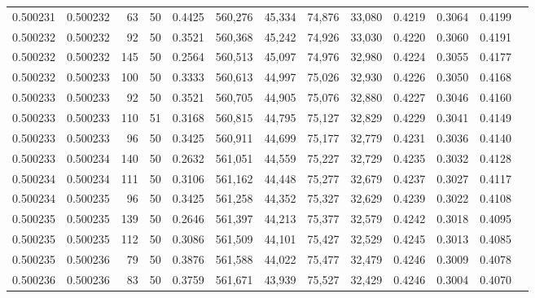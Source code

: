 \begin{tabular}{rrrrrrrrrrrrr}
0.500231 & 0.500232 &    63 &  50 &                                     0.4425 & 560,276 &  45,334 &  74,876 &  33,080 & 0.4219 & 0.3064 & 0.4199 \\
0.500232 & 0.500232 &    92 &  50 &                                     0.3521 & 560,368 &  45,242 &  74,926 &  33,030 & 0.4220 & 0.3060 & 0.4191 \\
0.500232 & 0.500232 &   145 &  50 &                                     0.2564 & 560,513 &  45,097 &  74,976 &  32,980 & 0.4224 & 0.3055 & 0.4177 \\
0.500232 & 0.500233 &   100 &  50 &                                     0.3333 & 560,613 &  44,997 &  75,026 &  32,930 & 0.4226 & 0.3050 & 0.4168 \\
0.500233 & 0.500233 &    92 &  50 &                                     0.3521 & 560,705 &  44,905 &  75,076 &  32,880 & 0.4227 & 0.3046 & 0.4160 \\
0.500233 & 0.500233 &   110 &  51 &                                     0.3168 & 560,815 &  44,795 &  75,127 &  32,829 & 0.4229 & 0.3041 & 0.4149 \\
0.500233 & 0.500233 &    96 &  50 &                                     0.3425 & 560,911 &  44,699 &  75,177 &  32,779 & 0.4231 & 0.3036 & 0.4140 \\
0.500233 & 0.500234 &   140 &  50 &                                     0.2632 & 561,051 &  44,559 &  75,227 &  32,729 & 0.4235 & 0.3032 & 0.4128 \\
0.500234 & 0.500234 &   111 &  50 &                                     0.3106 & 561,162 &  44,448 &  75,277 &  32,679 & 0.4237 & 0.3027 & 0.4117 \\
0.500234 & 0.500235 &    96 &  50 &                                     0.3425 & 561,258 &  44,352 &  75,327 &  32,629 & 0.4239 & 0.3022 & 0.4108 \\
0.500235 & 0.500235 &   139 &  50 &                                     0.2646 & 561,397 &  44,213 &  75,377 &  32,579 & 0.4242 & 0.3018 & 0.4095 \\
0.500235 & 0.500235 &   112 &  50 &                                     0.3086 & 561,509 &  44,101 &  75,427 &  32,529 & 0.4245 & 0.3013 & 0.4085 \\
0.500235 & 0.500236 &    79 &  50 &                                     0.3876 & 561,588 &  44,022 &  75,477 &  32,479 & 0.4246 & 0.3009 & 0.4078 \\
0.500236 & 0.500236 &    83 &  50 &                                     0.3759 & 561,671 &  43,939 &  75,527 &  32,429 & 0.4246 & 0.3004 & 0.4070 \\

\end{tabular}
